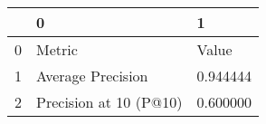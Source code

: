 \begin{tabular}{lll}
\toprule
 & 0 & 1 \\
\midrule
0 & Metric & Value \\
1 & Average Precision & 0.944444 \\
2 & Precision at 10 (P@10) & 0.600000 \\
\bottomrule
\end{tabular}
